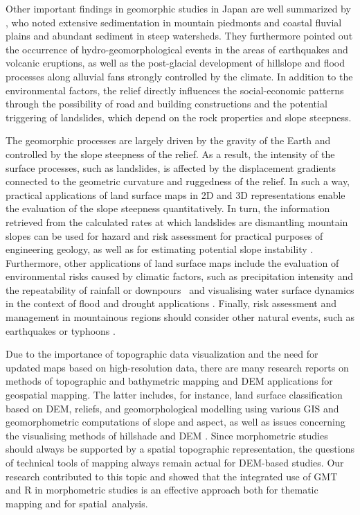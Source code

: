 \documentclass[land,article,accept,pdftex,moreauthors]{Definitions/mdpi}
\begin{document}
Other important findings in geomorphic studies in Japan are well summarized by \cite{OGUCHI20013}, who noted extensive sedimentation in mountain piedmonts and coastal fluvial plains and abundant sediment in steep watersheds. They furthermore pointed out the occurrence of hydro-geomorphological events in the areas of earthquakes and volcanic eruptions, as well as the post-glacial development of hillslope and flood processes along alluvial fans strongly controlled by the climate. In addition to the environmental factors, the relief directly influences the social-economic patterns through the possibility of road and building constructions and the potential triggering of landslides, which depend on the rock properties and slope steepness. 

The geomorphic processes are largely driven by the gravity of the Earth and controlled by the slope steepness of the relief. As a result, the intensity of the surface processes, such as landslides, is affected by the displacement gradients connected to the geometric curvature and ruggedness of the relief. In such a way, practical applications of land surface maps in 2D and 3D representations enable the evaluation of the slope steepness quantitatively. In turn, the information retrieved from the calculated rates at which landslides are dismantling mountain slopes can be used for hazard and risk assessment for practical purposes of engineering geology, as well as for estimating potential slope instability \cite{FUJISAWA2010150}. Furthermore, other applications of land surface maps include the evaluation of environmental risks caused by climatic factors, such as precipitation intensity and the repeatability of rainfall or downpours~\cite{Tsunetaka,Oku} and visualising water surface dynamics in the context of flood and drought applications \cite{rs14102475}. Finally, risk assessment and management in mountainous regions should consider other natural events, such as earthquakes or typhoons \cite{Yamada,Wangetal2010,HIRATA2019105217}. 


Due to the importance of topographic data visualization and the need for updated maps based on high-resolution data, there are many research reports on methods of topographic and bathymetric mapping and DEM applications for geospatial mapping. The latter includes, for instance, land surface classification based on DEM, reliefs, and geomorphological modelling using various GIS and geomorphometric computations of slope and aspect, as well as issues concerning the visualising methods of hillshade and DEM \cite{PRIMA2006373,LIN2004159,HAYAKAWA200690}. Since morphometric studies should always be supported by a spatial topographic representation, the questions of technical tools of mapping always remain actual for DEM-based studies. Our research contributed to this topic and showed that the integrated use of GMT and R in morphometric studies is an effective approach both for thematic mapping and for spatial~analysis. 
\end{document}
